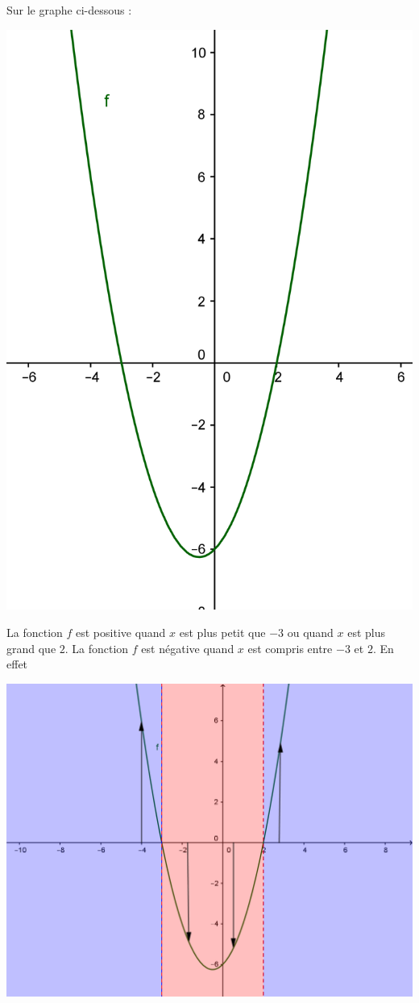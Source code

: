 \begin{exemple}
Sur le graphe ci-dessous :
\begin{center}
\includegraphics[scale=0.4]{affines/fct_signe.png}
\end{center}
La fonction $f$ est positive quand $x$ est plus petit que $-3$ ou quand $x$ est plus grand que $2$. La fonction $f$ est négative quand $x$ est compris entre $-3$ et $2$. En effet
\begin{center}
\includegraphics{affines/fct_signe_ex.png}
\end{center}


\end{exemple}
